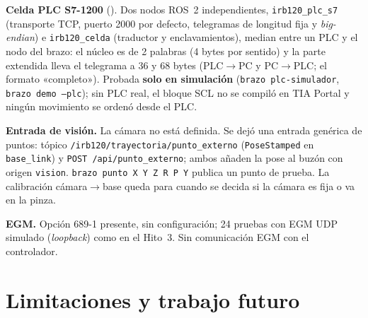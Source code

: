 \documentclass[10pt,a4paper]{article}
\DeclareRobustCommand{\ruta}[1]{\path{#1}}
\begin{document}
\textbf{Celda PLC S7-1200} (\ruta{docs/PLC_S7_1200.md}). Dos nodos ROS~2 independientes, \texttt{irb120\_plc\_s7} (transporte TCP, puerto 2000 por defecto, telegramas de longitud fija y \textit{big-endian}) e \texttt{irb120\_celda} (traductor y enclavamientos), median entre un PLC y el nodo del brazo: el núcleo es de 2 palabras (4 bytes por sentido) y la parte extendida lleva el telegrama a 36 y 68 bytes (PLC$\to$PC y PC$\to$PLC; el formato «completo»). Probada \textbf{solo en simulación} (\texttt{brazo plc-simulador}, \texttt{brazo demo --plc}); sin PLC real, el bloque SCL no se compiló en TIA Portal y ningún movimiento se ordenó desde el PLC.

\textbf{Entrada de visión.} La cámara no está definida. Se dejó una entrada genérica de puntos: tópico \texttt{/irb120/trayectoria/punto\_externo} (\texttt{PoseStamped} en \texttt{base\_link}) y \texttt{POST /api/punto\_externo}; ambos añaden la pose al buzón con origen \texttt{vision}. \texttt{brazo punto X Y Z R P Y} publica un punto de prueba. La calibración cámara$\to$base queda para cuando se decida si la cámara es fija o va en la pinza.

\textbf{EGM.} Opción 689-1 presente, sin configuración; 24 pruebas con EGM UDP simulado (\textit{loopback}) como en el Hito~3. Sin comunicación EGM con el controlador.

\section{Limitaciones y trabajo futuro}
\label{sec:pend}
\end{document}

